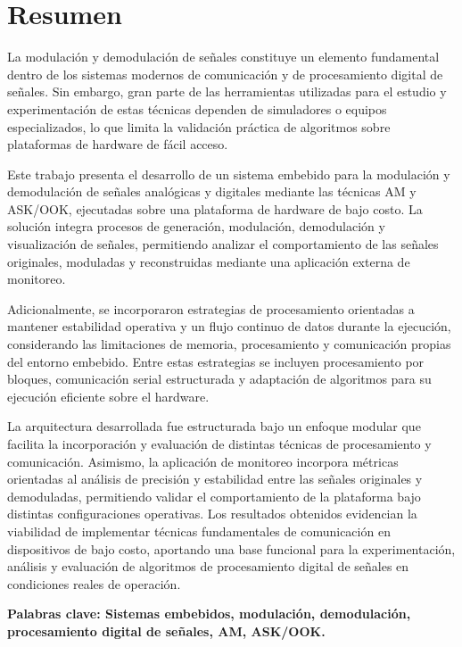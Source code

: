 \chapter*{Resumen}
\thispagestyle{empty}

La modulación y demodulación de señales constituye un elemento fundamental dentro de los sistemas modernos de comunicación y de procesamiento digital de señales. Sin embargo, gran parte de las herramientas utilizadas para el estudio y experimentación de estas técnicas dependen de simuladores o equipos especializados, lo que limita la validación práctica de algoritmos sobre plataformas de hardware de fácil acceso.

Este trabajo presenta el desarrollo de un sistema embebido para la modulación y demodulación de señales analógicas y digitales mediante las técnicas AM y ASK/OOK, ejecutadas sobre una plataforma de hardware de bajo costo. La solución integra procesos de generación, modulación, demodulación y visualización de señales, permitiendo analizar el comportamiento de las señales originales, moduladas y reconstruidas mediante una aplicación externa de monitoreo.

Adicionalmente, se incorporaron estrategias de procesamiento orientadas a mantener estabilidad operativa y un flujo continuo de datos durante la ejecución, considerando las limitaciones de memoria, procesamiento y comunicación propias del entorno embebido. Entre estas estrategias se incluyen procesamiento por bloques, comunicación serial estructurada y adaptación de algoritmos para su ejecución eficiente sobre el hardware.

La arquitectura desarrollada fue estructurada bajo un enfoque modular que facilita la incorporación y evaluación de distintas técnicas de procesamiento y comunicación. Asimismo, la aplicación de monitoreo incorpora métricas orientadas al análisis de precisión y estabilidad entre las señales originales y demoduladas, permitiendo validar el comportamiento de la plataforma bajo distintas configuraciones operativas. Los resultados obtenidos evidencian la viabilidad de implementar técnicas fundamentales de comunicación en dispositivos de bajo costo, aportando una base funcional para la experimentación, análisis y evaluación de algoritmos de procesamiento digital de señales en condiciones reales de operación.

\bigskip

\textbf{Palabras clave: Sistemas embebidos, modulación, demodulación, procesamiento digital de señales, AM, ASK/OOK.} %

\clearpage


